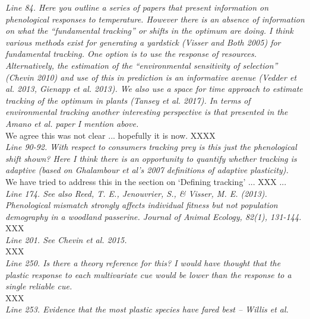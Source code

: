\documentclass[11pt]{article}
\begin{document}
\emph{Line 84. Here you outline a series of papers that present information on phenological
responses to temperature. However there is an absence of information on what the “fundamental
tracking” or shifts in the optimum are doing. I think various methods exist for generating a
yardstick (Visser and Both 2005) for fundamental tracking. One option is to use the response
of resources. Alternatively, the estimation of the “environmental sensitivity of selection”
(Chevin 2010) and use of this in prediction is an informative avenue (Vedder et al. 2013,
Gienapp et al. 2013). We also use a space for time approach to estimate tracking of the
optimum in plants (Tansey et al. 2017). In terms of environmental tracking another
interesting perspective is that presented in the Amano et al. paper I mention above.}\\

We agree this was not clear ... hopefully it is now. XXXX\\

\emph{Line 90-92. With respect to consumers tracking prey is this just the phenological shift
shown? Here I think there is an opportunity to quantify whether tracking is adaptive (based
on Ghalambour et al’s 2007 definitions of adaptive plasticity).}\\

We have tried to address this in the section on `Defining tracking' ... XXX ... \\

\emph{Line 174. See also Reed, T. E., Jenouvrier, S., \& Visser, M. E. (2013). Phenological mismatch
strongly affects individual fitness but not population demography in a woodland passerine.
Journal of Animal Ecology, 82(1), 131-144.}\\

XXX\\

\emph{Line 201. See Chevin et al. 2015.}\\

XXX\\

\emph{Line 250. Is there a theory reference for this? I would have thought that the plastic
response to each multivariate cue would be lower than the response to a single reliable cue.}\\

XXX\\

\emph{Line 253. Evidence that the most plastic species have fared best – Willis et al.}\\
\end{document}
